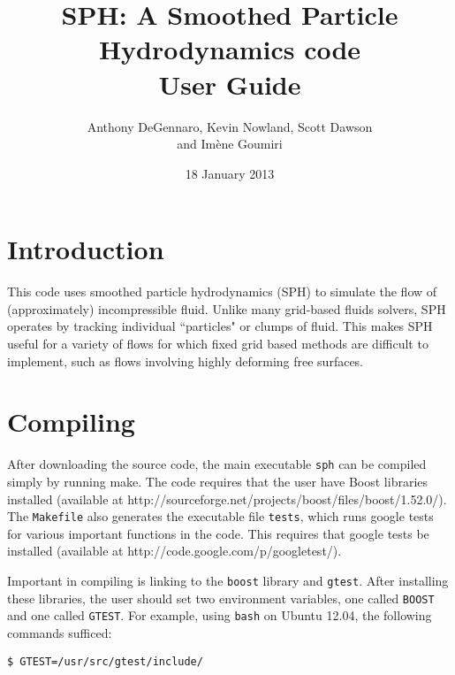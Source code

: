\documentclass[12pt]{article}
\begin{document}


\title{\textbf{\Large SPH: A Smoothed Particle Hydrodynamics code} \\ User Guide}
\author{Anthony DeGennaro, Kevin Nowland, Scott Dawson \\ and Im\`ene Goumiri}
\date{18 January 2013}
%
\maketitle


\section{Introduction}

This code uses smoothed particle hydrodynamics (SPH) to simulate the flow of (approximately) incompressible fluid. Unlike many grid-based fluids solvers, SPH operates by tracking individual ``particles" or clumps of fluid. This makes SPH useful for a variety of flows for which fixed grid based methods are difficult to implement, such as flows involving highly deforming free surfaces.

\section{Compiling}
After downloading the source code, the main executable \texttt{sph} can be compiled simply by running make. The code requires that the user have Boost libraries installed (available at http://sourceforge.net/projects/boost/files/boost/1.52.0/). The \texttt{Makefile} also generates the executable file \texttt{tests}, which runs google tests for various important functions in the code. This requires that google tests be installed (available at http://code.google.com/p/googletest/). 

Important in compiling is linking to the \texttt{boost} library and 
\texttt{gtest}. After installing these libraries, the user should set two
environment variables, one called \texttt{BOOST} and one called 
\texttt{GTEST}. For example, using \texttt{bash} on Ubuntu 12.04, the
following commands sufficed:

\texttt{\$  GTEST=/usr/src/gtest/include/}
\end{document}
